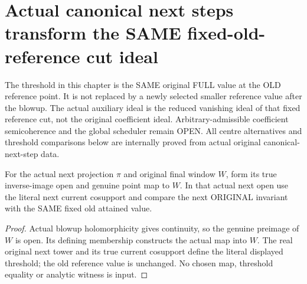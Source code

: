 \section{Actual canonical next steps transform the SAME fixed-old-reference cut ideal}

The threshold in this chapter is the SAME original FULL value at the OLD
reference point. It is not replaced by a newly selected smaller reference
value after the blowup. The actual auxiliary ideal is the reduced vanishing
ideal of that fixed reference cut, not the original coefficient ideal.
Arbitrary-admissible coefficient semicoherence and the global scheduler remain
OPEN. All centre alternatives and threshold comparisons below are internally
proved from actual original canonical-next-step data.

\begin{definition}
\label{hir:original-canonical-next-true-fixed-reference-objects}
\leanok
{}
For the actual next projection $\pi$ and original final window $W$, form
its true inverse-image open and genuine point map to $W$. In that actual
next open use the literal next current cosupport and compare the next
ORIGINAL invariant with the SAME fixed old attained value.
\end{definition}
\begin{proof}
Actual blowup holomorphicity gives continuity, so the genuine preimage of
$W$ is open. Its defining membership constructs the actual map into $W$.
The real original next tower and its true current cosupport define the
literal displayed threshold; the old reference value is unchanged. No
chosen map, threshold equality or analytic witness is input.
\end{proof}

